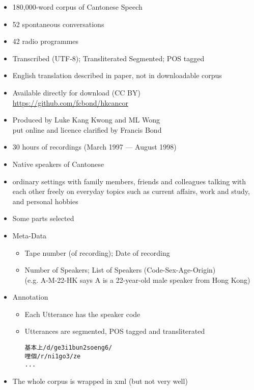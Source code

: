 \documentclass[a4paper,landscape,headrule,footrule,xetex]{foils}
\begin{document}

\makexeCJKactive
{}
\begin{itemize}
\item 180,000-word corpus of Cantonese Speech
\item 52 spontaneous conversations
\item 42 radio programmes
\item Transcribed (UTF-8); Transliterated Segmented; POS tagged
\item English translation described in paper, not in downloadable corpus
\item Available directly for download (CC BY)
\\ \url{https://github.com/fcbond/hkcancor}
\item Produced by Luke Kang Kwong and ML Wong
  \\ put online and licence clarified by Francis Bond 
\end{itemize}
\begin{itemize}
\item 30 hours of recordings (March 1997 --- August 1998)
\item Native speakers of Cantonese
\item ordinary settings with family members, friends and colleagues talking with each other freely on everyday topics such as current affairs, work and study, and personal hobbies
\item Some parts selected
\end{itemize}

\begin{itemize}
\item Meta-Data
  \begin{itemize}
  \item Tape number (of recording);  Date of recording
  \item Number of Speakers; List of Speakers (Code-Sex-Age-Origin) \\
(e.g. A-M-22-HK says A is a 22-year-old male speaker from Hong Kong)
  \end{itemize}
\item Annotation
  \begin{itemize}
  \item Each Utterance has the speaker code
  \item Utterances are segmented, POS tagged and transliterated
    \begin{verbatim}
基本上/d/ge3i1bun2soeng6/
哩個/r/ni1go3/ze
...
\end{verbatim}
  \end{itemize}
\item The whole corpus is wrapped in xml (but not very well)
\end{itemize}
\end{document}
